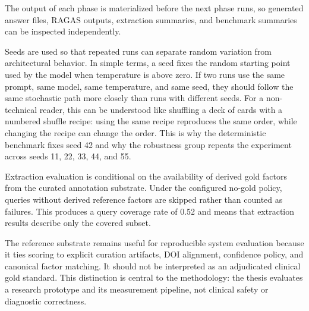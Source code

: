 The output of each phase is materialized before the next phase runs, so generated answer files, RAGAS outputs, extraction summaries, and benchmark summaries can be inspected independently.

Seeds are used so that repeated runs can separate random variation from architectural behavior. In simple terms, a seed fixes the random starting point used by the model when temperature is above zero. If two runs use the same prompt, same model, same temperature, and same seed, they should follow the same stochastic path more closely than runs with different seeds. For a non-technical reader, this can be understood like shuffling a deck of cards with a numbered shuffle recipe: using the same recipe reproduces the same order, while changing the recipe can change the order. This is why the deterministic benchmark fixes seed 42 and why the robustness group repeats the experiment across seeds 11, 22, 33, 44, and 55.

Extraction evaluation is conditional on the availability of derived gold factors from the curated annotation substrate. Under the configured no-gold policy, queries without derived reference factors are skipped rather than counted as failures. This produces a query coverage rate of 0.52 and means that extraction results describe only the covered subset.

The reference substrate remains useful for reproducible system evaluation because it ties scoring to explicit curation artifacts, DOI alignment, confidence policy, and canonical factor matching. It should not be interpreted as an adjudicated clinical gold standard. This distinction is central to the methodology: the thesis evaluates a research prototype and its measurement pipeline, not clinical safety or diagnostic correctness.
